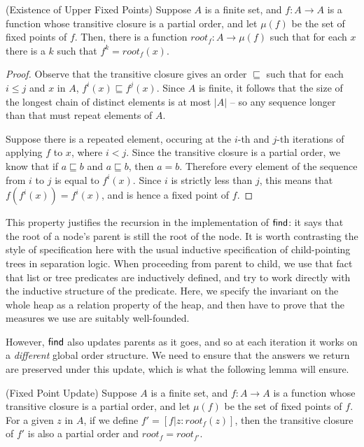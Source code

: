\begin{lemma}{(Existence of Upper Fixed Points)}
Suppose $A$ is a finite set, and $f : A \to A$ is a function whose
transitive closure is a partial order, and let $\mu(f)$ be the
set of fixed points of $f$. Then, there is a function 
$\mathit{root}_f : A \to \mu(f)$ such that for each $x$ there is a 
$k$ such that $f^{k} = \mathit{root}_f(x)$.
\end{lemma}

\begin{proof}
Observe that the transitive closure gives an order $\sqsubseteq$ such
that for each $i \leq j$ and $x$ in $A$, $f^i(x) \sqsubseteq
f^j(x)$. Since $A$ is finite, it follows that the size of the longest
chain of distinct elements is at most $|A|$ -- so any sequence longer
than that must repeat elements of $A$.

Suppose there is a repeated element, occuring at the $i$-th and
$j$-th iterations of applying $f$ to $x$, where $i < j$. Since the
transitive closure is a partial order, we know that if $a \sqsubseteq
b$ and $a \sqsubseteq b$, then $a = b$. Therefore every element 
of the sequence from $i$ to $j$ is equal to $f^i(x)$. Since $i$ is
strictly less than $j$, this means that $f(f^i(x)) = f^i(x)$, and 
is hence a fixed point of $f$. 
\end{proof}

This property justifies the recursion in the implementation of
$\mathsf{find}$: it says that the root of a node's parent is still the root of
the node. It is worth contrasting the style of specification here with
the usual inductive specification of child-pointing trees in
separation logic. When proceeding from parent to child, we use that
fact that list or tree predicates are inductively defined, and try to
work directly with the inductive structure of the predicate.  Here, we
specify the invariant on the whole heap as a relation property of the
heap, and then have to prove that the measures we use are suitably
well-founded.


However, $\mathsf{find}$ also updates parents as it goes, and so at each
iteration it works on a \emph{different} global order structure.
We need to ensure that the answers we return are preserved under
this update, which is what the following lemma will ensure. 

\begin{lemma}{(Fixed Point Update)}
Suppose $A$ is a finite set, and $f : A \to A$ is a function whose
transitive closure is a partial order, and let $\mu(f)$ be the set of
fixed points of $f$. For a given $z$ in $A$, if we define $f' =
[f|z:\mathit{root}_f(z)]$, then the transitive closure of $f'$ is also
a partial order and $\mathit{root}_f = \mathit{root}_{f'}$.
\end{lemma}

